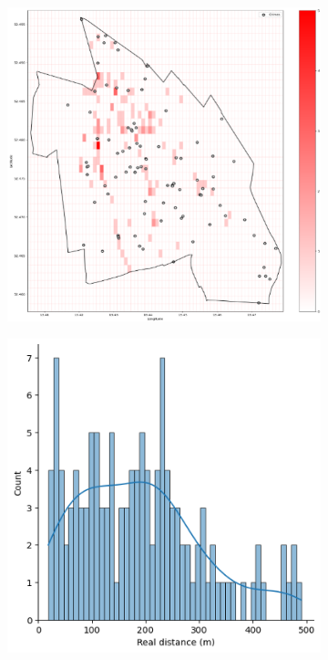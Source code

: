 \begin{figure}[h]
    \centering
    \begin{subfigure}[b]{0.45\textwidth}
        \centering
        \includegraphics[width=\textwidth]{./figures/Gerard/money.png}
        \caption{}
        \label{fig:image1}
    \end{subfigure}
    \hfill
    \begin{subfigure}[b]{0.45\textwidth}
        \centering
        \includegraphics[width=\textwidth]{./figures/Gerard/money_1.png}
        \caption{}
        \label{fig:image2}
    \end{subfigure}

\end{figure}

